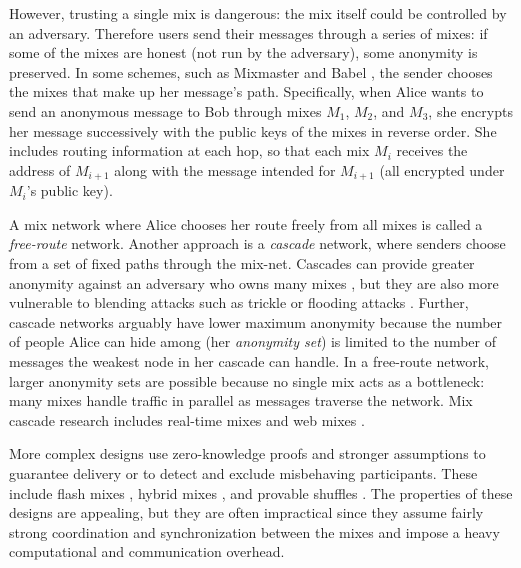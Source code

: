 \documentclass[times,10pt,twocolumn]{article}
\begin{document}
However, trusting a single mix is dangerous: the mix itself could be
controlled by an adversary. Therefore users send their messages through
a series of mixes: if some of the mixes are honest (not run by the
adversary),
some anonymity is preserved. In some schemes, such as Mixmaster
\cite{mixmaster-spec} and Babel \cite{babel}, the sender chooses the
mixes that make up her message's path. Specifically, when Alice
wants to send an anonymous message to Bob through mixes $M_1$, $M_2$,
and $M_3$, she encrypts her message successively with the public keys of
the mixes in reverse order. She includes routing information at each hop,
so that each mix $M_i$ receives the address of $M_{i+1}$ along with the
message intended for $M_{i+1}$ (all encrypted under $M_i$'s public key).

A mix network where Alice chooses her route freely from all mixes is
called a \emph{free-route} network. Another approach is a \emph{cascade}
network, where senders choose from a set of fixed paths through the
mix-net. Cascades can provide greater anonymity against an adversary
who owns many mixes \cite{disad-free-routes}, but they are also more
vulnerable to blending attacks such as trickle or flooding attacks
\cite{trickle02}.
Further, cascade networks arguably have lower maximum anonymity because
the number of people Alice can hide among (her \emph{anonymity set}) is limited
to the number of messages the weakest node in her cascade can handle.
In a free-route network, larger anonymity sets are possible because no
single mix acts as a bottleneck: many mixes handle traffic in parallel as
messages traverse the network.
Mix cascade research includes real-time
mixes \cite{realtime-mix} and web mixes \cite{web-mix}.

More complex designs use zero-knowledge proofs and stronger assumptions
to guarantee delivery or to detect and exclude misbehaving participants.
These include flash mixes \cite{flash-mix},
hybrid mixes \cite{jakobsson-optimally,hybrid-mix},
and provable shuffles \cite{PShuffle,shuffle}. The properties
of these designs are appealing, but they are often impractical since
they assume fairly strong coordination and synchronization between the mixes
and impose a heavy computational and communication overhead.
\end{document}
